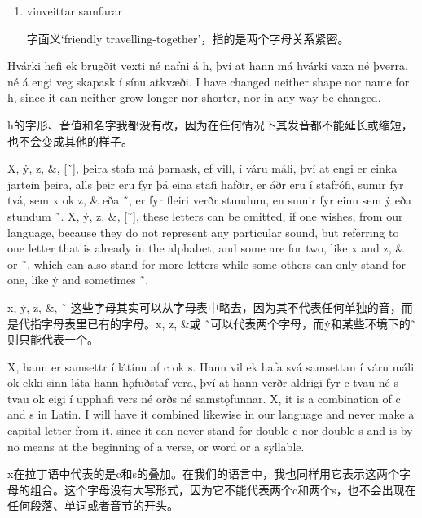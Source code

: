 \begin{grammar*}{}
    \begin{enumerate}[leftmargin=*]
        \item vinveittar samfarar

              字面义`friendly travelling-together'，指的是两个字母关系紧密。
    \end{enumerate}
\end{grammar*}
\begin{paracol}{2}
    Hvárki hefi ek brugðit vexti né nafni á h, því at hann má hvárki vaxa né þverra, né á engi veg skapask í sínu atkvæði.
    \switchcolumn
    I have changed neither shape nor name for h, since it can neither grow longer nor shorter, nor in any way be changed.
\end{paracol}
\begin{translation*}{}
    h的字形、音值和名字我都没有改，因为在任何情况下其发音都不能延长或缩短，也不会变成其他的样子。
\end{translation*}

\begin{paracol}{2}
    X, ẏ, z, \&, [˜], þeira stafa má þarnask, ef vill, í váru máli, því at engi er einka jartein þeira, alls þeir eru fyr þá eina stafi hafðir, er áðr eru í stafrófi, sumir fyr tvá, sem x ok z, \& eða ˜, er fyr fleiri verðr stundum, en sumir fyr einn sem ẏ eða stundum ˜.
    \switchcolumn
    X, ẏ, z, \&, [˜], these letters can be omitted, if one wishes, from our language, because they do not represent any particular sound, but referring to one letter that is already in the alphabet, and some are for two, like x and z, \& or ˜, which can also stand for more letters while some others can only stand for one, like ẏ and sometimes ˜.
\end{paracol}
\begin{translation*}{}
    x, ẏ, z, \&, ˜ 这些字母其实可以从字母表中略去，因为其不代表任何单独的音，而是代指字母表里已有的字母。x, z, \&或 ˜可以代表两个字母，而ẏ和某些环境下的˜则只能代表一个。
\end{translation*}
\begin{paracol}{2}
    X, hann er samsettr í látínu af c ok s. Hann vil ek hafa svá samsettan í váru máli ok ekki sinn láta hann hǫfuðstaf vera, því at hann verðr aldrigi fyr c tvau né s tvau ok eigi í upphafi vers né orðs né samstǫfunnar.
    \switchcolumn
    X, it is a combination of c and s in Latin. I will have it combined likewise in our language and never make a capital letter from it, since it can never stand for double c nor double s and is by no means at the beginning of a verse, or word or a syllable.
\end{paracol}
\begin{translation*}{}
    x在拉丁语中代表的是c和s的叠加。在我们的语言中，我也同样用它表示这两个字母的组合。这个字母没有大写形式，因为它不能代表两个c和两个s，也不会出现在任何段落、单词或者音节的开头。
\end{translation*}

